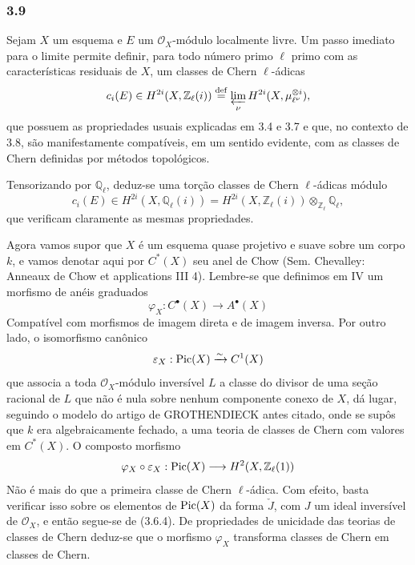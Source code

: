 \subsubsection*{3.9}
Sejam $X$ um esquema e $E$ um $\mathcal O_X$-módulo localmente livre. Um passo imediato para o limite permite definir, para todo número primo $\ell$ primo com as características residuais de $X$, um classes de Chern $\ell$-ádicas
\[
c_i(E)\in H^{2i}(X,\mathbb Z_\ell(i))
\stackrel{\mathrm{def}}{=}\varprojlim_\nu H^{2i}(X,\mu_{\ell^\nu}^{\otimes i}),
\]
que possuem as propriedades usuais explicadas em 3.4 e 3.7 e que, no contexto de 3.8, são manifestamente compatíveis, em um sentido evidente, com as classes de Chern definidas por métodos topológicos.

Tensorizando por $\mathbb Q_\ell$, deduz-se uma torção classes de Chern $\ell$-ádicas módulo
\[
c_i(E)\in H^{2i}(X,\mathbb Q_\ell(i))
=H^{2i}(X,\mathbb Z_\ell(i))\otimes_{\mathbb Z_\ell}\mathbb Q_\ell,
\]
que verificam claramente as mesmas propriedades.

Agora vamos supor que $X$ é um esquema quase projetivo e suave sobre um corpo $k$, e vamos denotar aqui por $C^*(X)$ seu anel de Chow (Sem. Chevalley: Anneaux de Chow et applications III 4). Lembre-se que definimos em IV um morfismo de anéis graduados
\[
\varphi_X:C^{\bullet}(X)\to A^{\bullet}(X)
\]
Compatível com morfismos de imagem direta e de imagem inversa. Por outro lado, o isomorfismo canônico
\[
\varepsilon_X:\operatorname{Pic}(X)\xrightarrow{\sim} C^1(X)
\]
que associa a toda $\mathcal O_X$-módulo inversível $L$ a classe do divisor de uma seção racional de $L$ que não é nula sobre nenhum componente conexo de $X$, dá lugar, seguindo o modelo do artigo de GROTHENDIECK antes citado, onde se supôs que $k$ era algebraicamente fechado, a uma teoria de classes de Chern com valores em $C^*(X)$. O composto morfismo
\[
\varphi_X\circ\varepsilon_X:\operatorname{Pic}(X)\longrightarrow H^2(X,\mathbb Z_\ell(1))
\]
Não é mais do que a primeira classe de Chern $\ell$-ádica. Com efeito, basta verificar isso sobre os elementos de $\operatorname{Pic}(X)$ da forma $\check J$, com $J$ um ideal inversível de $\mathcal O_X$, e então segue-se de (3.6.4). De propriedades de unicidade das teorias de classes de Chern deduz-se que o morfismo $\varphi_X$ transforma classes de Chern em classes de Chern.
